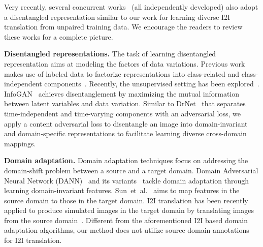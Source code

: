 \documentclass[runningheads]{llncs}
\newlength\paramargin
\newcommand{\Paragraph}[1]
{\vspace{2mm} \noindent \textbf{#1}}
\def\etal{et~al.\xspace}
\begin{document}
Very recently, several concurrent works~\cite{almahairi2018augmented,huang2018munit,cao2018dida,ma2018exemplar} (all independently developed) also adopt a disentangled representation similar to our work for learning diverse I2I translation from unpaired training data.
We encourage the readers to review these works for a complete picture.
\vspace{\paramargin}

\Paragraph{Disentangled representations.}
The task of learning disentangled representation aims at modeling the factors of data variations.
Previous work makes use of labeled data to factorize representations into class-related and class-independent components~\cite{cheung2014discovering,kingma2014semi,makhzani2015adversarial,mathieu2016disentangling}.
Recently, the unsupervised setting has been explored~\cite{chen2016infogan,denton2017unsupervised}.
InfoGAN~\cite{chen2016infogan} achieves disentanglement by maximizing the mutual information between latent variables and data variation.
Similar to DrNet~\cite{denton2017unsupervised} that separates time-independent and time-varying components with an adversarial loss, we apply a content adversarial loss to disentangle an image into domain-invariant and domain-specific representations to facilitate learning diverse cross-domain mappings. 

\vspace{\paramargin}
\Paragraph{Domain adaptation.}
Domain adaptation techniques focus on addressing the domain-shift problem between a source and a target domain.
Domain Adversarial Neural Network (DANN)~\cite{ganin2015unsupervised,ganin2016domain} and its variants~\cite{tzeng2014deep,bousmalis2016domain,Tsai_adaptseg_2018} tackle domain adaptation through learning domain-invariant features.
Sun~\etal~\cite{sun2016return} aims to map features in the source domain to those in the target domain. 
I2I translation has been recently applied to produce simulated images in the target domain by translating images from the source domain~\cite{ganin2015unsupervised,hoffman2017cycada}.
Different from the aforementioned I2I based domain adaptation algorithms, our method does not utilize source domain annotations for I2I translation. 
\end{document}
